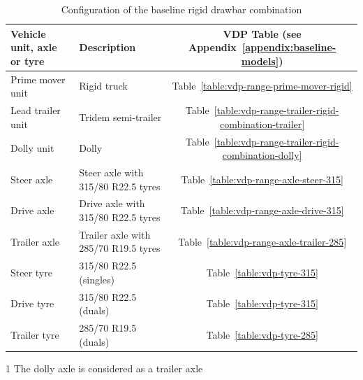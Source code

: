 \begin{table}[H]
	\centering\footnotesize
	\begin{threeparttable}

		\begin{tabulary}{\textwidth}{llc}
			\toprule
    \textbf{Vehicle unit, axle or tyre} & \textbf{Description} & \textbf{VDP Table (see Appendix~\ref{appendix:baseline-models})} \\
    			\midrule
    Prime mover unit & Rigid truck & Table~\ref{table:vdp-range-prime-mover-rigid} \\
    Lead trailer unit & Tridem semi-trailer & Table~\ref{table:vdp-range-trailer-rigid-combination-trailer} \\
    Dolly unit & Dolly & Table~\ref{table:vdp-range-trailer-rigid-combination-dolly} \\
    Steer axle  & Steer axle with 315/80 R22.5 tyres & Table~\ref{table:vdp-range-axle-steer-315} \\
    Drive axle & Drive axle with 315/80 R22.5 tyres & Table~\ref{table:vdp-range-axle-drive-315} \\
    Trailer axle & Trailer axle with 285/70 R19.5 tyres & Table~\ref{table:vdp-range-axle-trailer-285} \\
    Steer tyre & 315/80 R22.5 (singles) & Table~\ref{table:vdp-tyre-315} \\
    Drive tyre  & 315/80 R22.5 (duals) & Table~\ref{table:vdp-tyre-315} \\
    Trailer tyre & 285/70 R19.5 (duals) & Table~\ref{table:vdp-tyre-285} \\
			\bottomrule
		\end{tabulary}

		\caption{Configuration of the baseline rigid drawbar combination}
		\label{table:configuration-rigid-drawbar-combination}

		\begin{tablenotes}
		\item[1] The dolly axle is considered as a trailer axle
		\end{tablenotes}

	\end{threeparttable}
\end{table}


